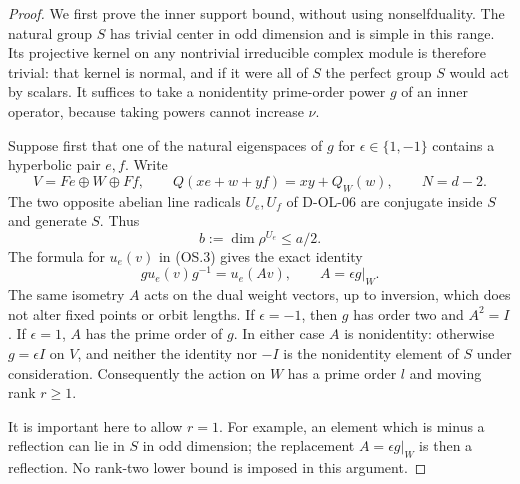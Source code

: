 \begin{proof}
We first prove the inner support bound, without using
nonselfduality.  The natural group $S$ has trivial center in odd
dimension and is simple in this range.  Its projective kernel
on any nontrivial irreducible complex module is therefore trivial:
that kernel is normal, and if it were all of $S$ the perfect
group $S$ would act by scalars.  It suffices to take a nonidentity
prime-order power $g$ of an inner operator, because taking powers
cannot increase $\nu$.

Suppose first that one of the natural eigenspaces of $g$ for
$\epsilon\in\{1,-1\}$ contains a hyperbolic pair $e,f$.
Write
\[
 V=Fe\oplus W\oplus Ff,\qquad
 Q(xe+w+yf)=xy+Q_W(w),\qquad N=d-2.                          \tag{OO.3}
\]
The two opposite abelian line radicals $U_e,U_f$ of D-OL-06
are conjugate inside $S$ and generate $S$.  Thus
\[
                       b:=\dim\rho^{U_e}\le a/2.           \tag{OO.4}
\]
The formula for $u_e(v)$ in (OS.3) gives the exact identity
\[
              gu_e(v)g^{-1}=u_e(Av),\qquad A=\epsilon g|_W.
                                                               \tag{OO.5}
\]
The same isometry $A$ acts on the dual weight vectors, up to
inversion, which does not alter fixed points or orbit lengths.
If $\epsilon=-1$, then $g$ has order two and $A^2=I$.
If $\epsilon=1$, $A$ has the prime order of $g$.  In either
case $A$ is nonidentity: otherwise $g=\epsilon I$ on $V$,
and neither the identity nor $-I$ is the nonidentity element
of $S$ under consideration.  Consequently the action on $W$
has a prime order $l$ and moving rank $r\ge1$.

It is important here to allow $r=1$.  For example, an element
which is minus a reflection can lie in $S$ in odd dimension;
the replacement $A=\epsilon g|_W$ is then a reflection.  No
rank-two lower bound is imposed in this argument.


\end{proof}
